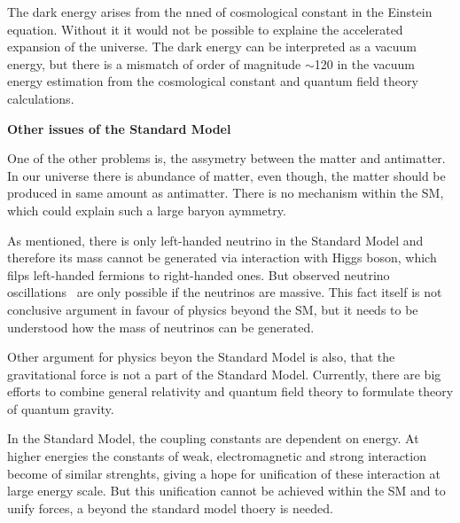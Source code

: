 The dark energy arises from the nned of cosmological constant in the Einstein equation. Without it it would not be possible to explaine the accelerated expansion of the universe. The dark energy can be interpreted as a vacuum energy, but there is a mismatch of order of magnitude $\sim$120 in the vacuum energy estimation from the cosmological constant and quantum field theory calculations.



\textbf{Other issues of the Standard Model}

One of the other problems is, the assymetry between the matter and antimatter. In our universe there is abundance of matter, even though, the matter should be produced in same amount as antimatter. There is no mechanism within the SM, which could explain such a large baryon aymmetry.

As mentioned, there is only left-handed neutrino in the Standard Model and therefore its mass cannot be generated via interaction with Higgs boson, which filps left-handed fermions to right-handed ones. But observed neutrino oscillations~\cite{Fukuda:1998mi, Ahmad:2001an} are only possible if the neutrinos are massive. This fact itself is not conclusive argument in favour of physics beyond the SM, but it needs to be understood how the mass of neutrinos can be generated.

Other argument for physics beyon the Standard Model is also, that the gravitational force is not a part of the Standard Model. Currently, there are big efforts to combine general relativity and quantum field theory to formulate theory of quantum gravity.  

In the Standard Model, the coupling constants are dependent on energy. At higher energies the constants of weak, electromagnetic and strong interaction become of similar strenghts, giving a hope for unification of these interaction at large energy scale. But this unification cannot be achieved within the SM and to unify forces, a beyond the standard model thoery is needed.
 
